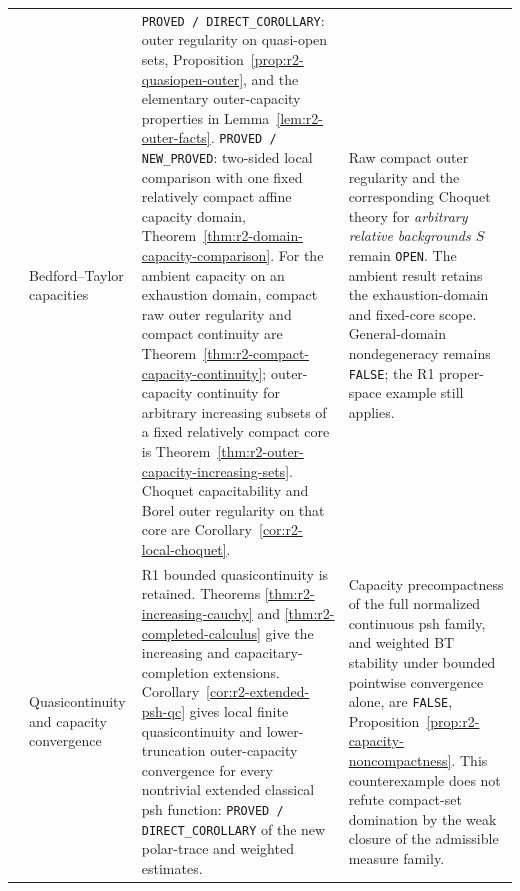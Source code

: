 \documentclass[11pt,a4paper]{article}
\numberwithin{equation}{section}
\theoremstyle{definition}
\theoremstyle{remark}
\begin{document}
\begin{longtable}{@{}>{\raggedright\arraybackslash}p{}>{\raggedright\arraybackslash}p{}>{\raggedright\arraybackslash}p{}>{\raggedright\arraybackslash}p{}@{}}
6 & Bedford--Taylor capacities &
\texttt{PROVED / DIRECT\_COROLLARY}: outer regularity on quasi-open
sets, Proposition~\ref{prop:r2-quasiopen-outer}, and the elementary
outer-capacity properties in Lemma~\ref{lem:r2-outer-facts}.
\texttt{PROVED / NEW\_PROVED}: two-sided local comparison with one
fixed relatively compact affine capacity domain,
Theorem~\ref{thm:r2-domain-capacity-comparison}. For the ambient
capacity on an exhaustion domain, compact raw outer regularity and
compact continuity are Theorem~\ref{thm:r2-compact-capacity-continuity};
outer-capacity continuity for arbitrary increasing subsets of a
fixed relatively compact core is
Theorem~\ref{thm:r2-outer-capacity-increasing-sets}.
Choquet capacitability and Borel outer regularity on that core are
Corollary~\ref{cor:r2-local-choquet}. &
Raw compact outer regularity and the corresponding Choquet theory
for \emph{arbitrary relative backgrounds $S$} remain \texttt{OPEN}.
The ambient result retains the exhaustion-domain and fixed-core
scope. General-domain nondegeneracy remains \texttt{FALSE}; the R1
proper-space example still applies.\\[5pt]

7 & Quasicontinuity and capacity convergence &
R1 bounded quasicontinuity is retained. Theorems
\ref{thm:r2-increasing-cauchy} and \ref{thm:r2-completed-calculus}
give the increasing and capacitary-completion extensions.
Corollary~\ref{cor:r2-extended-psh-qc} gives local finite
quasicontinuity and lower-truncation outer-capacity convergence for
every nontrivial extended classical psh function:
\texttt{PROVED / DIRECT\_COROLLARY} of the new polar-trace and
weighted estimates. &
Capacity precompactness of the full normalized continuous psh family,
and weighted BT stability under bounded pointwise convergence alone,
are \texttt{FALSE},
Proposition~\ref{prop:r2-capacity-noncompactness}. This counterexample
does not refute compact-set domination by the weak closure of the
admissible measure family.\\[5pt]


\end{longtable}
\end{document}
